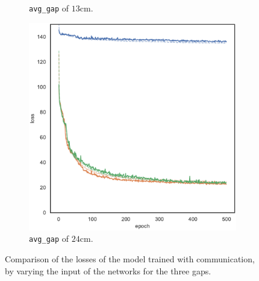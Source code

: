 \begin{figure}[!htb]
\begin{center}
\begin{subfigure}[h]{0.32\textwidth}
			\caption{\texttt{avg\_gap} of $13$\gls{cm}.}
		\end{subfigure}
		\hfill
		\begin{subfigure}[h]{0.32\textwidth}
			\includegraphics[width=\textwidth]{contents/images/task1-comm/loss-communication-gap_24@copy}
			\caption{\texttt{avg\_gap} of $24$\gls{cm}.}
		\end{subfigure}
	\end{center}
	\vspace{-0.5cm}
	\caption[Summary, in terms of loss, of the first set of experiments 
	(communication).]{Comparison of the losses of the model trained with 
		communication, by varying the input of the networks for the three gaps.}
	\label{fig:commloss81324}
\end{figure}

